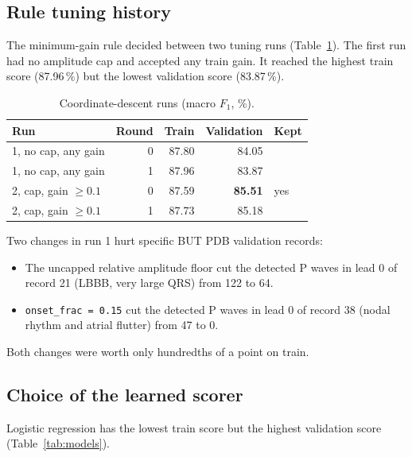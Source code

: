 \documentclass[11pt,a4paper]{article}
\newcommand{\code}[1]{\texttt{#1}}
\begin{document}
\subsection{Rule tuning history}

The minimum-gain rule decided between two tuning runs (Table~\ref{tab:tuning}). The first run had no amplitude cap and accepted any train gain. It reached the highest train score (87.96\,\%) but the lowest validation score (83.87\,\%).

\begin{table}[htbp]
\centering\small
\caption{Coordinate-descent runs (macro $F_1$, \%).}
\label{tab:tuning}
\begin{tabular}{lrrrl}
\toprule
Run & Round & Train & Validation & Kept \\
\midrule
1, no cap, any gain & 0 & 87.80 & 84.05 & \\
1, no cap, any gain & 1 & 87.96 & 83.87 & \\
2, cap, gain $\ge 0.1$ & 0 & 87.59 & \textbf{85.51} & yes \\
2, cap, gain $\ge 0.1$ & 1 & 87.73 & 85.18 & \\
\bottomrule
\end{tabular}
\end{table}

Two changes in run 1 hurt specific BUT PDB validation records:
\begin{itemize}
\item The uncapped relative amplitude floor cut the detected P waves in lead 0 of record 21 (LBBB, very large QRS) from 122 to 64.
\item \code{onset\_frac = 0.15} cut the detected P waves in lead 0 of record 38 (nodal rhythm and atrial flutter) from 47 to 0.
\end{itemize}
Both changes were worth only hundredths of a point on train.

\subsection{Choice of the learned scorer}

Logistic regression has the lowest train score but the highest validation score (Table~\ref{tab:models}).
\end{document}
